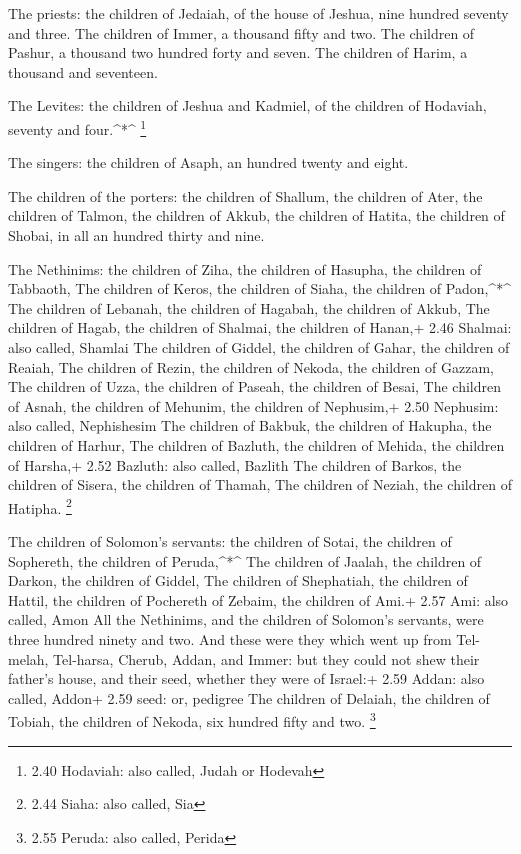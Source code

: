  The priests: the children of Jedaiah, of the house of
Jeshua, nine hundred seventy and three.  The children of
Immer, a thousand fifty and two.  The children of Pashur, a
thousand two hundred forty and seven.  The children of
Harim, a thousand and seventeen.

 The Levites: the children of Jeshua and Kadmiel, of the
children of Hodaviah, seventy and four.\^{}*\^{} \footnote{2.40
  Hodaviah: also called, Judah or Hodevah}

 The singers: the children of Asaph, an hundred twenty and
eight.

 The children of the porters: the children of Shallum, the
children of Ater, the children of Talmon, the children of Akkub, the
children of Hatita, the children of Shobai, in all an hundred thirty and
nine.

 The Nethinims: the children of Ziha, the children of
Hasupha, the children of Tabbaoth,  The children of Keros,
the children of Siaha, the children of Padon,\^{}*\^{}  The
children of Lebanah, the children of Hagabah, the children of Akkub,
 The children of Hagab, the children of Shalmai, the
children of Hanan,+ 2.46 Shalmai: also called, Shamlai  The
children of Giddel, the children of Gahar, the children of Reaiah,
 The children of Rezin, the children of Nekoda, the
children of Gazzam,  The children of Uzza, the children of
Paseah, the children of Besai,  The children of Asnah, the
children of Mehunim, the children of Nephusim,+ 2.50 Nephusim: also
called, Nephishesim  The children of Bakbuk, the children
of Hakupha, the children of Harhur,  The children of
Bazluth, the children of Mehida, the children of Harsha,+ 2.52 Bazluth:
also called, Bazlith  The children of Barkos, the children
of Sisera, the children of Thamah,  The children of Neziah,
the children of Hatipha. \footnote{2.44 Siaha: also called, Sia}

 The children of Solomon's servants: the children of Sotai,
the children of Sophereth, the children of Peruda,\^{}*\^{}
 The children of Jaalah, the children of Darkon, the
children of Giddel,  The children of Shephatiah, the
children of Hattil, the children of Pochereth of Zebaim, the children of
Ami.+ 2.57 Ami: also called, Amon  All the Nethinims, and
the children of Solomon's servants, were three hundred ninety and two.
 And these were they which went up from Tel-melah,
Tel-harsa, Cherub, Addan, and Immer: but they could not shew their
father's house, and their seed, whether they were of Israel:+ 2.59
Addan: also called, Addon+ 2.59 seed: or, pedigree  The
children of Delaiah, the children of Tobiah, the children of Nekoda, six
hundred fifty and two. \footnote{2.55 Peruda: also called, Perida}

